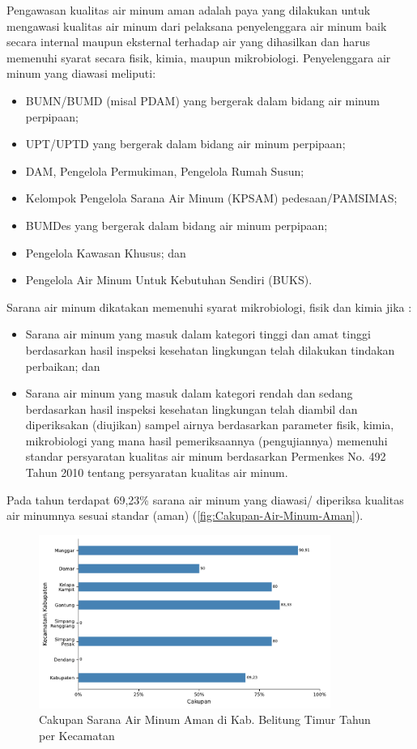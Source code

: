 Pengawasan kualitas air minum aman adalah paya yang dilakukan untuk mengawasi kualitas air minum dari pelaksana penyelenggara air minum baik secara internal maupun eksternal terhadap air yang dihasilkan dan harus memenuhi syarat secara fisik, kimia, maupun mikrobiologi.
Penyelenggara air minum yang diawasi  meliputi:
\begin{itemize}
	\item BUMN/BUMD (misal PDAM) yang bergerak dalam bidang air minum perpipaan;
	\item UPT/UPTD yang bergerak dalam bidang air minum perpipaan;
	\item DAM, Pengelola Permukiman, Pengelola Rumah Susun;
	\item Kelompok Pengelola Sarana Air Minum (KPSAM) pedesaan/PAMSIMAS;
	\item BUMDes yang bergerak dalam bidang air minum perpipaan;
	\item Pengelola Kawasan Khusus; dan
	\item Pengelola Air Minum Untuk Kebutuhan Sendiri (BUKS).
\end{itemize}
Sarana air minum dikatakan memenuhi syarat mikrobiologi, fisik dan kimia jika :
\begin{itemize}
	\item Sarana air minum  yang masuk dalam kategori tinggi dan amat tinggi  berdasarkan hasil inspeksi kesehatan lingkungan telah dilakukan tindakan perbaikan; dan
	\item Sarana air minum yang masuk dalam kategori rendah dan sedang berdasarkan hasil inspeksi   kesehatan lingkungan telah diambil dan diperiksakan (diujikan) sampel airnya berdasarkan parameter fisik, kimia, mikrobiologi yang mana hasil pemeriksaannya (pengujiannya) memenuhi standar persyaratan kualitas air minum berdasarkan Permenkes No. 492 Tahun 2010 tentang  persyaratan kualitas air minum.
\end{itemize}

Pada tahun \tP terdapat 69,23\% sarana air minum yang diawasi/ diperiksa kualitas air minumnya sesuai standar (aman) (\autoref{fig:Cakupan-Air-Minum-Aman}).

\begin{figure}[H]
	\centering
	\includegraphics[width=0.85\textwidth]{bab_07/bab_07_01_airMinumAman}
	\caption{Cakupan Sarana Air Minum Aman di Kab. Belitung Timur Tahun \tP per Kecamatan}
	\label{fig:Cakupan-Air-Minum-Aman}
\end{figure}

